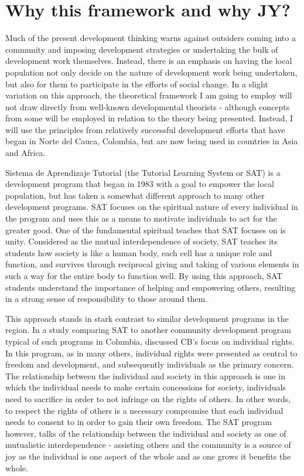 \section{Why this framework and why JY?}


Much of the present development thinking warns against outsiders coming into a community and imposing development strategies or undertaking the bulk of development work themselves. Instead, there is an emphasis on having the local population not only decide on the nature of development work being undertaken, but also for them to participate in the efforts of social change. In a slight variation on this approach, the theoretical framework I am going to employ will not draw directly from well-known developmental theorists - although concepts from some will be employed in relation to the theory being presented. Instead, I will use the principles from relatively successful development efforts that have began in Norte del Cauca, Colombia, but are now being used in countries in Asia and Africa. %

Sistema de Aprendizaje Tutorial (the Tutorial Learning System or SAT) is a development program that began in 1983 with a goal to empower the local population, but has taken a somewhat different approach to many other development programs. SAT focuses on the spiritual nature of every individual in the program and uses this as a means to motivate individuals to act for the greater good. One of the fundamental spiritual teaches that SAT focuses on is unity. Considered as the mutual interdependence of society, SAT teaches its students how society is like a human body, each cell has a unique role and function, and survives through reciprocal giving and taking of various elements in such a way for the entire body to function well. By using this approach, SAT students understand the importance of helping and empowering others, resulting in a strong sense of responsibility to those around them. 

This approach stands in stark contrast to similar development programs in the region. In a study comparing SAT to another community development program typical of such programs in Columbia, \citet{Honeyman2010} discussed CB's focus on individual rights. In this program, as in many others, individual rights were presented as central to freedom and development, and subsequently individuals as the primary concern. The relationship between the individual and society in this approach is one in which the individual needs to make certain concessions for society, individuals need to sacrifice in order to not infringe on the rights of others. In other words, to respect the rights of others is a necessary compromise that each individual needs to consent to in order to gain their own freedom. The SAT program however, talks of the relationship between the individual and society as one of mutualistic interdependence - assisting others and the community is a source of joy as the individual is one aspect of the whole and as one grows it benefits the whole. 

